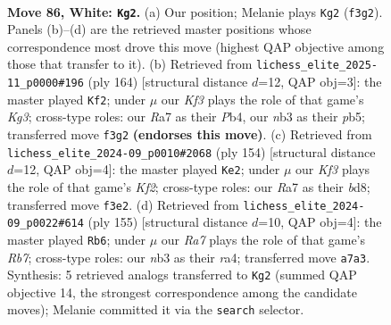 \documentclass[11pt]{article}
\begin{document}
\clearpage

\begin{figure}[p]\centering
\begin{subfigure}{0.46\textwidth}\centering
\resizebox{\linewidth}{!}{%
\newchessgame
\chessboard[
  setfen={8/R6P/3k2p1/5p2/5P2/1n3K2/8/8 w - - 5 86},
  showmover=false,
  pgfstyle=straightmove, color=movearrow, markmove={f3-g2}
]}
\caption{}
\end{subfigure}\hfill
\begin{subfigure}{0.46\textwidth}\centering
\resizebox{\linewidth}{!}{%
\newchessgame
\chessboard[
  setfen={8/2k5/8/1p2p1p1/1P2P1P1/6K1/8/8 w - - 2 83},
  showmover=false,
  pgfstyle=straightmove, color=movearrow, markmove={g3-f2}
]}
\caption{}
\end{subfigure}
\\[4pt]
\begin{subfigure}{0.46\textwidth}\centering
\resizebox{\linewidth}{!}{%
\newchessgame
\chessboard[
  setfen={3b4/8/6N1/5p2/2k1p3/4P3/5K2/8 w - - 10 78},
  showmover=false,
  pgfstyle=straightmove, color=movearrow, markmove={f2-e2}
]}
\caption{}
\end{subfigure}\hfill
\begin{subfigure}{0.46\textwidth}\centering
\resizebox{\linewidth}{!}{%
\newchessgame
\chessboard[
  setfen={8/8/5kp1/8/R4Pp1/6P1/1r6/5K2 b - - 60 78},
  showmover=false,
  pgfstyle=straightmove, color=movearrow, markmove={b2-b6}
]}
\caption{}
\end{subfigure}
\caption{\textbf{Move 86, White: \texttt{Kg2}.} (a) Our position; Melanie plays \texttt{Kg2} (\texttt{f3g2}). Panels (b)--(d) are the retrieved master positions whose correspondence most drove this move (highest QAP objective among those that transfer to it). (b) Retrieved from \texttt{lichess\_elite\_2025-11\_p0000\#196} (ply 164) [structural distance $d$=12, QAP obj=3]: the master played \texttt{Kf2}; under $\mu$ our \emph{Kf3} plays the role of that game's \emph{Kg3}; cross-type roles: our \emph{R}a7 as their \emph{P}b4, our \emph{n}b3 as their \emph{p}b5; transferred move \texttt{f3g2} \textbf{(endorses this move)}. (c) Retrieved from \texttt{lichess\_elite\_2024-09\_p0010\#2068} (ply 154) [structural distance $d$=12, QAP obj=4]: the master played \texttt{Ke2}; under $\mu$ our \emph{Kf3} plays the role of that game's \emph{Kf2}; cross-type roles: our \emph{R}a7 as their \emph{b}d8; transferred move \texttt{f3e2}. (d) Retrieved from \texttt{lichess\_elite\_2024-09\_p0022\#614} (ply 155) [structural distance $d$=10, QAP obj=4]: the master played \texttt{Rb6}; under $\mu$ our \emph{Ra7} plays the role of that game's \emph{Rb7}; cross-type roles: our \emph{n}b3 as their \emph{r}a4; transferred move \texttt{a7a3}. Synthesis: 5 retrieved analogs transferred to \texttt{Kg2} (summed QAP objective 14, the strongest correspondence among the candidate moves); Melanie committed it via the \texttt{search} selector.}
\label{fig:thought-m170}
\end{figure}
\end{document}
